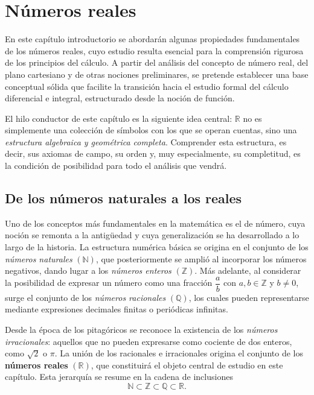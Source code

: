 
\chapter{Números reales}

En este capítulo introductorio se abordarán algunas propiedades fundamentales
de los números reales, cuyo estudio resulta esencial para la comprensión
rigurosa de los principios del cálculo. A partir del análisis del concepto de
número real, del plano cartesiano y de otras nociones preliminares, se pretende
establecer una base conceptual sólida que facilite la transición hacia el
estudio formal del cálculo diferencial e integral, estructurado desde la noción
de función.

El hilo conductor de este capítulo es la siguiente idea central: $\mathbb{R}$
no es simplemente una colección de símbolos con los que se operan cuentas, sino
una \emph{estructura algebraica y geométrica completa}. Comprender esta
estructura, es decir, sus axiomas de campo, su orden y, muy especialmente, su completitud, es la condición de posibilidad para todo el análisis que vendrá.

\section{De los números naturales a los reales}

Uno de los conceptos más fundamentales en la matemática es el de número, cuya
noción se remonta a la antigüedad y cuya generalización se ha desarrollado a lo
largo de la historia. La estructura numérica básica se origina en el conjunto de
los \textit{números naturales} $(\mathbb{N})$, que posteriormente se amplió al
incorporar los números negativos, dando lugar a los \textit{números enteros}
$(\mathbb{Z})$. Más adelante, al considerar la posibilidad de expresar un número
como una fracción $\dfrac{a}{b}$ con $a,b \in \mathbb{Z}$ y $b \neq 0$, surge el
conjunto de los \textit{números racionales} $(\mathbb{Q})$, los cuales pueden
representarse mediante expresiones decimales finitas o periódicas infinitas.

Desde la época de los pitagóricos se reconoce la existencia de los
\textit{números irracionales}: aquellos que no pueden expresarse como cociente
de dos enteros, como $\sqrt{2}$ o $\pi$. La unión de los racionales e
irracionales origina el conjunto de los \textbf{números reales} $(\mathbb{R})$,
que constituirá el objeto central de estudio en este capítulo. Esta jerarquía se
resume en la cadena de inclusiones
\[
   \mathbb{N} \subset \mathbb{Z} \subset \mathbb{Q} \subset \mathbb{R}.
\]

